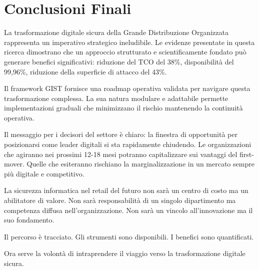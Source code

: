 \section{\texorpdfstring{\textbf{Conclusioni Finali}}{5.8 - Conclusioni Finali}}
\label{sec:5.8}

La trasformazione digitale sicura della Grande Distribuzione Organizzata rappresenta un imperativo strategico ineludibile. Le evidenze presentate in questa ricerca dimostrano che un approccio strutturato e scientificamente fondato può generare benefici significativi: riduzione del TCO del 38\%, disponibilità del 99,96\%, riduzione della superficie di attacco del 43\%.

Il framework GIST fornisce una roadmap operativa validata per navigare questa trasformazione complessa. La sua natura modulare e adattabile permette implementazioni graduali che minimizzano il rischio mantenendo la continuità operativa.

Il messaggio per i decisori del settore è chiaro: la finestra di opportunità per posizionarsi come leader digitali si sta rapidamente chiudendo. Le organizzazioni che agiranno nei prossimi 12-18 mesi potranno capitalizzare sui vantaggi del first-mover. Quelle che esiteranno rischiano la marginalizzazione in un mercato sempre più digitale e competitivo.

La sicurezza informatica nel retail del futuro non sarà un centro di costo ma un abilitatore di valore. Non sarà responsabilità di un singolo dipartimento ma competenza diffusa nell'organizzazione. Non sarà un vincolo all'innovazione ma il suo fondamento.

Il percorso è tracciato. Gli strumenti sono disponibili. I benefici sono quantificati. 

Ora serve la volontà di intraprendere il viaggio verso la trasformazione digitale sicura.


